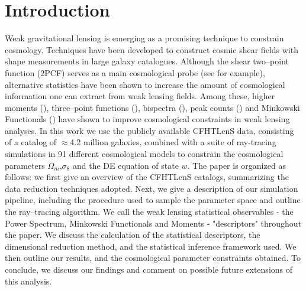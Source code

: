\documentclass[reprint,aps,prd,superscriptaddress,showkeys,showpacs]{revtex4-1}
\begin{document}


\maketitle



\section{Introduction}
%

Weak gravitational lensing is emerging as a promising technique to constrain cosmology. Techniques have been developed to construct cosmic shear fields with shape measurements in large galaxy catalogues. Although the shear two--point function (2PCF) serves as a main cosmological probe (see \citep{CFHTKilbinger} for example), alternative statistics have been shown to increase the amount of cosmological information one can extract from weak lensing fields. Among these, higher moments (\citep{moments1,moments2,moments3,moments4,moments5,moments6}), three--point functions (\citep{3pcf1,3pcf2}), bispectra (\citep{bispectrum1,bispectrum2,bispectrum3,bispectrum4}), peak counts (\citep{peaks1,peaks2,peaks3,peaks4,peaks5,peaks6}) and Minkowski Functionals (\citep{MinkJan,Petri2013}) have shown to improve cosmological constraints in weak lensing analyses.  
In this work we use the publicly available CFHTLenS data, consisting of a catalog of $\approx$4.2 million galaxies, combined with a suite of ray-tracing simulations in 91 different cosmological models to constrain the cosmological parameters $\Omega_m$,$\sigma_8$ and the DE equation of state $w$. The paper is organized as follows: we first give an overview of the CFHTLenS catalogs, summarizing the data reduction techniques adopted. Next, we give a description of our simulation pipeline, including the procedure used to sample the parameter space and outline the ray--tracing algorithm. We call the weak lensing statistical observables - the Power Spectrum, Minkowski Functionals and Moments - "descriptors" throughout the paper. We discuss the calculation of the statistical descriptors, the dimensional reduction method, and the statistical inference framework used. We then outline our results, and the cosmological parameter constraints obtained. To conclude, we discuss our findings and comment on possible future extensions of this analysis.  
\end{document}
